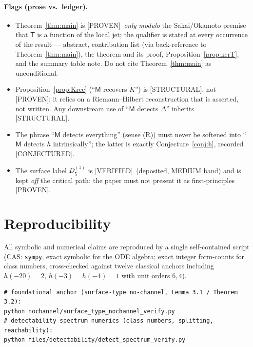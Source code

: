\documentclass[11pt]{article}
\theoremstyle{definition}
\newcommand{\Tch}{\mathsf{T}}
\newcommand{\Mch}{\mathsf{M}}
\newcommand{\PROVEN}{\textsf{[PROVEN]}}
\newcommand{\VERIFIED}{\textsf{[VERIFIED]}}
\newcommand{\STRUCTURAL}{\textsf{[STRUCTURAL]}}
\newcommand{\CONJ}{\textsf{[CONJECTURED]}}
\begin{document}
\paragraph{Flags (prose vs.\ ledger).}
\begin{itemize}[leftmargin=2em]
\item Theorem~\ref{thm:main} is \PROVEN\ \emph{only modulo} the Sakai/Okamoto premise
that $\Tch$ is a function of the local jet; the qualifier is stated at every
occurrence of the result --- abstract, contribution list (via back-reference to
Theorem~\ref{thm:main}), the theorem and its proof, Proposition~\ref{prop:kerT}, and
the summary table note. Do not cite Theorem~\ref{thm:main} as unconditional.
\item Proposition~\ref{prop:Krec} (``$\Mch$ recovers $K$'') is \STRUCTURAL, not
\PROVEN: it relies on a Riemann--Hilbert reconstruction that is asserted, not written.
Any downstream use of ``$\Mch$ detects $\Delta$'' inherits \STRUCTURAL.
\item The phrase ``$\Mch$ detects everything'' (sense (R)) must never be softened into
``$\Mch$ detects $h$ intrinsically''; the latter is exactly Conjecture~\ref{conj:h},
recorded \CONJ.
\item The surface label $D_5^{(1)}$ is \VERIFIED\ (deposited, MEDIUM band) and is kept
\emph{off} the critical path; the paper must not present it as first-principles
\PROVEN.
\end{itemize}

\section{Reproducibility}\label{sec:repro}

All symbolic and numerical claims are reproduced by a single self-contained script
(CAS: \texttt{sympy}, exact symbolic for the ODE algebra; exact integer
form-counts for class numbers, cross-checked against twelve classical anchors
including $h(-20)=2$, $h(-3)=h(-4)=1$ with unit orders $6,4$).

\begin{verbatim}
# foundational anchor (surface-type no-channel, Lemma 3.1 / Theorem 3.2):
python nochannel/surface_type_nochannel_verify.py
# detectability spectrum numerics (class numbers, splitting, reachability):
python files/detectability/detect_spectrum_verify.py
\end{verbatim}
\end{document}

